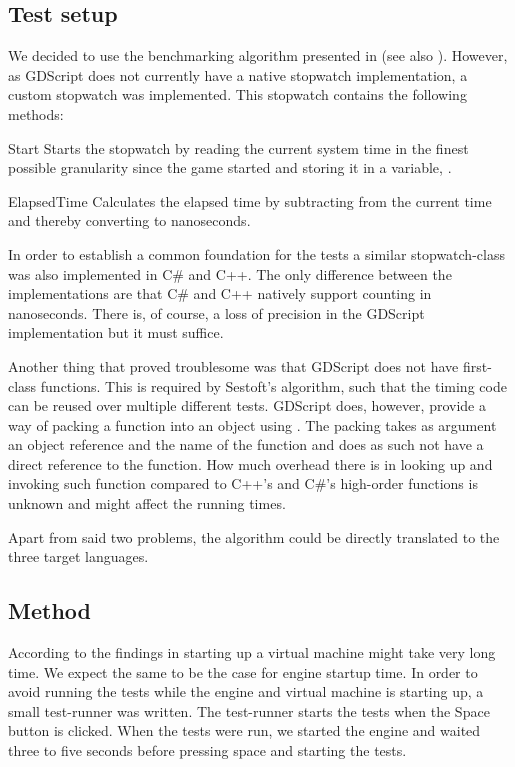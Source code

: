 \subsection{Test setup}
We decided to use the  benchmarking algorithm presented in \cite{sestoft2013microbenchmarks} (see also ). However, as GDScript does not currently have a native stopwatch implementation, a custom stopwatch was implemented. This stopwatch contains the following methods:
\begin{labeling}{\quad\quad}
    \item[Start] Starts the stopwatch by reading the current system time in the finest possible granularity since the game started and storing it in a variable, .
    \item[ElapsedTime] Calculates the elapsed time by subtracting  from the current time and thereby converting to nanoseconds.
\end{labeling}
In order to establish a common foundation for the tests a similar stopwatch-class was also implemented in C\# and C++. The only difference between the implementations are that C\# and C++ natively support counting in nanoseconds. There is, of course, a loss of precision in the GDScript implementation but it must suffice. 

Another thing that proved troublesome was that GDScript does not have first-class functions. This is required by Sestoft's algorithm, such that the timing code can be reused over multiple different tests. GDScript does, however, provide a way of packing a function into an object using  \cite{godot:funcref}. The packing takes as argument an object reference and the name of the function and does as such not have a direct reference to the function. How much overhead there is in looking up and invoking such function compared to C++'s and C\#'s high-order functions is unknown and might affect the running times.

Apart from said two problems, the  algorithm could be directly translated to the three target languages.

\subsection{Method}
According to the findings in \cite{vmwarmup} starting up a virtual machine might take very long time. We expect the same to be the case for engine startup time. In order to avoid running the tests while the engine and virtual machine is starting up, a small test-runner was written. The test-runner starts the tests when the Space button is clicked. When the tests were run, we started the engine and waited three to five seconds before pressing space and starting the tests.

